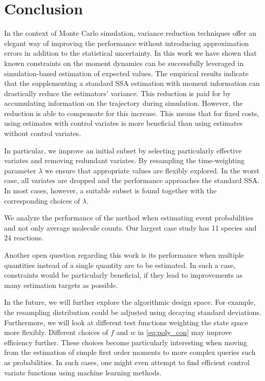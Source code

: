 \section{Conclusion}\label{sec:cv:conclusion}
In the context of Monte Carlo simulation, variance reduction
techniques offer an elegant way of improving the performance without
introducing approximation errors in addition to the statistical uncertainty.
In this work we have shown that known constraints on the moment dynamics can be successfully
leveraged in simulation-based estimation of expected values.
The empirical results indicate that
the supplementing a standard \ac{SSA} estimation with moment information
can drastically reduce the estimators' variance.
This reduction is paid for by accumulating information on the trajectory
during simulation.
However, the reduction is able to compensate for this increase.
This means that for fixed costs, using   estimates with
  control variates is more beneficial than using estimates without control variates.


In particular, we improve an initial subset by selecting particularly effective variates and removing redundant variates.
By resampling the time-weighting parameter $\lambda$ we ensure that appropriate values  are
flexibly explored.
In the worst case, all variates are dropped and the performance approaches the standard \ac{SSA}.
In most cases, however, a suitable subset is found together with the corresponding choices of $\lambda$.

We  analyze the performance of the method when estimating event probabilities and not only average molecule counts. Our largest case study has \num{11} species and
\num{24} reactions. %

Another open question regarding this work is its performance when multiple
quantities instead of a single quantity are to be estimated. In such
a case, constraints would be particularly beneficial, if they lead
to improvements  as many estimation targets as possible.


In the future, we will further explore the algorithmic design space.
For example, the resampling distribution could be adjusted using decaying standard deviations.
Furthermore, we will look at different test functions weighting the state space more flexibly.
Different choices of $f$ and $w$ in \eqref{eq:poly_con} may improve 
efficiency further.
These choices become particularly interesting when moving from the estimation
of simple first order moments to more complex queries such as probabilities.
In such cases, one might even attempt to find efficient control variate functions
using machine learning methods.


